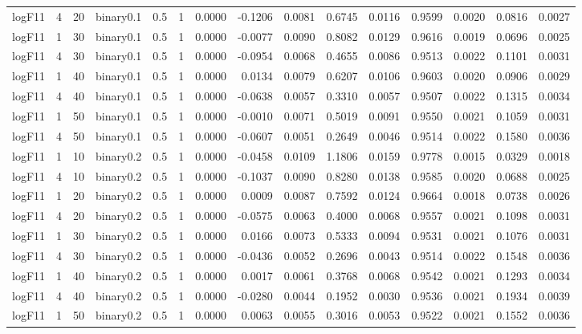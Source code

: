 \begin{longtable}{rrrrrrrrrrrrrrr}
  logF11 & 4 & 20 & binary0.1 & 0.5 & 1 & 0.0000 & -0.1206 & 0.0081 & 0.6745 & 0.0116 & 0.9599 & 0.0020 & 0.0816 & 0.0027 \\ 
  logF11 & 1 & 30 & binary0.1 & 0.5 & 1 & 0.0000 & -0.0077 & 0.0090 & 0.8082 & 0.0129 & 0.9616 & 0.0019 & 0.0696 & 0.0025 \\ 
  logF11 & 4 & 30 & binary0.1 & 0.5 & 1 & 0.0000 & -0.0954 & 0.0068 & 0.4655 & 0.0086 & 0.9513 & 0.0022 & 0.1101 & 0.0031 \\ 
  logF11 & 1 & 40 & binary0.1 & 0.5 & 1 & 0.0000 & 0.0134 & 0.0079 & 0.6207 & 0.0106 & 0.9603 & 0.0020 & 0.0906 & 0.0029 \\ 
  logF11 & 4 & 40 & binary0.1 & 0.5 & 1 & 0.0000 & -0.0638 & 0.0057 & 0.3310 & 0.0057 & 0.9507 & 0.0022 & 0.1315 & 0.0034 \\ 
  logF11 & 1 & 50 & binary0.1 & 0.5 & 1 & 0.0000 & -0.0010 & 0.0071 & 0.5019 & 0.0091 & 0.9550 & 0.0021 & 0.1059 & 0.0031 \\ 
  logF11 & 4 & 50 & binary0.1 & 0.5 & 1 & 0.0000 & -0.0607 & 0.0051 & 0.2649 & 0.0046 & 0.9514 & 0.0022 & 0.1580 & 0.0036 \\ 
  logF11 & 1 & 10 & binary0.2 & 0.5 & 1 & 0.0000 & -0.0458 & 0.0109 & 1.1806 & 0.0159 & 0.9778 & 0.0015 & 0.0329 & 0.0018 \\ 
  logF11 & 4 & 10 & binary0.2 & 0.5 & 1 & 0.0000 & -0.1037 & 0.0090 & 0.8280 & 0.0138 & 0.9585 & 0.0020 & 0.0688 & 0.0025 \\ 
  logF11 & 1 & 20 & binary0.2 & 0.5 & 1 & 0.0000 & 0.0009 & 0.0087 & 0.7592 & 0.0124 & 0.9664 & 0.0018 & 0.0738 & 0.0026 \\ 
  logF11 & 4 & 20 & binary0.2 & 0.5 & 1 & 0.0000 & -0.0575 & 0.0063 & 0.4000 & 0.0068 & 0.9557 & 0.0021 & 0.1098 & 0.0031 \\ 
  logF11 & 1 & 30 & binary0.2 & 0.5 & 1 & 0.0000 & 0.0166 & 0.0073 & 0.5333 & 0.0094 & 0.9531 & 0.0021 & 0.1076 & 0.0031 \\ 
  logF11 & 4 & 30 & binary0.2 & 0.5 & 1 & 0.0000 & -0.0436 & 0.0052 & 0.2696 & 0.0043 & 0.9514 & 0.0022 & 0.1548 & 0.0036 \\ 
  logF11 & 1 & 40 & binary0.2 & 0.5 & 1 & 0.0000 & 0.0017 & 0.0061 & 0.3768 & 0.0068 & 0.9542 & 0.0021 & 0.1293 & 0.0034 \\ 
  logF11 & 4 & 40 & binary0.2 & 0.5 & 1 & 0.0000 & -0.0280 & 0.0044 & 0.1952 & 0.0030 & 0.9536 & 0.0021 & 0.1934 & 0.0039 \\ 
  logF11 & 1 & 50 & binary0.2 & 0.5 & 1 & 0.0000 & 0.0063 & 0.0055 & 0.3016 & 0.0053 & 0.9522 & 0.0021 & 0.1552 & 0.0036 \\ 

\end{longtable}
